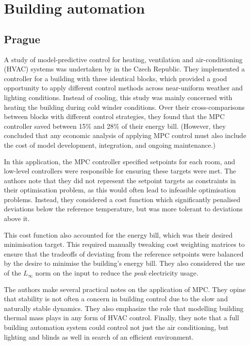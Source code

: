 \section{Building automation}

\subsection{Prague}

A study of model-predictive control for heating, ventilation and
air-conditioning (HVAC) systems was undertaken by \textcite{Siroky11} in the Czech Republic.
They implemented a controller for a building with three identical blocks, which provided a good opportunity to apply different control methods across near-uniform weather and lighting conditions.
Instead of cooling, this study was mainly concerned with heating the building during cold winder conditions.
Over their cross-comparisons between blocks with different control strategies, they found that the MPC controller saved between 15\% and 28\% of their energy bill.
(However, they concluded that any economic analysis of applying MPC control must also include the cost of model development, integration, and ongoing maintenance.)

In this application, the MPC controller specified setpoints for each room, and low-level controllers were responsible for ensuring these targets were met.
The authors note that they did not represent the setpoint targets as constraints in their optimisation problem, as this would often lead to infeasible optimisation problems.
Instead, they considered a cost function which significantly penalised deviations below the reference temperature, but was more tolerant to deviations above it.

This cost function also accounted for the energy bill, which was their desired minimisation target.
This required manually tweaking cost weighting matrices to ensure that the tradeoffs of deviating from the reference setpoints were balanced by the desire to minimise the building's energy bill.
They also considered the use of the $L_\infty$ norm on the input to reduce the \emph{peak} electricity usage.

The authors make several practical notes on the application of MPC\@.
They opine that stability is not often a concern in building control due to the slow and naturally stable dynamics.
They also emphasize the role that modelling building thermal mass plays in any form of HVAC control.
Finally, they note that a full building automation system could control not just the air conditioning, but lighting and blinds as well in search of an efficient environment.

